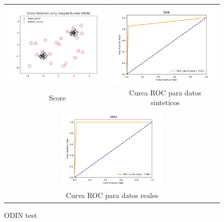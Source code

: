 \begin{figure}[H]
  \begin{tabular}{cc}
    \includegraphics[width=65mm,height=40mm]{imagenes/odin-sintetico.png} &   \includegraphics[width=65mm,height=40mm]{imagenes/odin-sintetic-roc.png} \\
  Score & Curca ROC para datos sinteticos \\[6pt]
  \multicolumn{2}{c}{\includegraphics[width=65mm,height=39mm]{imagenes/odin-test.png} }\\
  \multicolumn{2}{c}{Curva ROC para datos reales}\\
  \end{tabular}
  \caption{\label{fig:odintest} ODIN test}
\end{figure}


